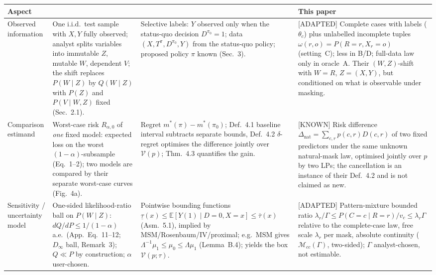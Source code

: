 \begin{tabular}{p{} p{} p{} p{}}
\toprule
Aspect & \citet{subbaswamy2021evaluating} & \citet{guerdan2024predictive} & This paper \\
\midrule
Observed information &
One i.i.d.\ test sample with $X,Y$ fully observed; analyst splits variables into immutable $Z$, mutable $W$, dependent $V$; the shift replaces $P(W\mid Z)$ by $Q(W\mid Z)$ with $P(Z)$ and $P(V\mid W,Z)$ fixed (Sec.~2.1). &
Selective labels: $Y$ observed only when the status-quo decision $D^{\pi_0}=1$; data $(X,T^{\pi},D^{\pi_0},Y)$ from the status-quo policy; proposed policy $\pi$ known (Sec.~3). &
[ADAPTED] Complete cases with labels ($\theta_c$) plus unlabelled incomplete tuples $\omega(r,o)=P(R=r,X_r=o)$ (setting~C); less in B/D; full-data law only in oracle~A. Their $(W,Z)$-shift with $W=R$, $Z=(X,Y)$, but conditioned on what is observable under masking. \\
\midrule
Comparison estimand &
Worst-case risk $R_{\alpha,0}$ of \emph{one} fixed model: expected loss on the worst $(1-\alpha)$-subsample (Eq.~1--2); two models are compared by their separate worst-case curves (Fig.~4a). &
Regret $m^*(\pi)-m^*(\pi_0)$; Def.~4.1 baseline interval subtracts separate bounds, Def.~4.2 $\delta$-regret optimises the difference jointly over $\mathcal{V}(p)$; Thm.~4.3 quantifies the gain. &
[KNOWN] Risk difference $\Delta_{\mathrm{nat}}=\sum_{c,r}p(c,r)D(c,r)$ of two fixed predictors under the same unknown natural-mask law, optimised jointly over $p$ by two LPs; the cancellation is an instance of their Def.~4.2 and is not claimed as new. \\
\midrule
Sensitivity / uncertainty model &
One-sided likelihood-ratio ball on $P(W\mid Z)$: $dQ/dP\le 1/(1-\alpha)$ a.e.\ (App.\ Eq.~11--12; $D_\infty$ ball, Remark~3); $Q\ll P$ by construction; $\alpha$ user-chosen. &
Pointwise bounding functions $\underline{\tau}(x)\le\mathbb{E}[Y(1)\mid D=0,X=x]\le\overline{\tau}(x)$ (Asm.~5.1), implied by MSM/Rosenbaum/IV/proximal; e.g.\ MSM gives $\Lambda^{-1}\mu_1\le\mu_0\le\Lambda\mu_1$ (Lemma~B.4); yields the box $\mathcal{V}(p;\tau)$. &
[ADAPTED] Pattern-mixture bounded ratio $\lambda_r/\Gamma\le P(C=c\mid R=r)/v_c\le\lambda_r\Gamma$ relative to the complete-case law, free scale $\lambda_r$ per mask, absolute continuity ($\mathcal{M}_{cc}(\Gamma)$, two-sided); $\Gamma$ analyst-chosen, not estimable. \\

\end{tabular}
